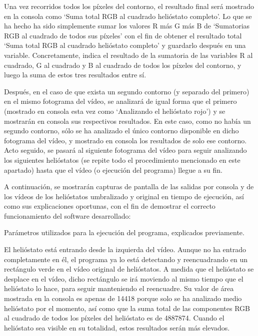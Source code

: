 \documentclass[12pt]{article}
\begin{document}
Una vez recorridos todos los píxeles del contorno, el resultado final será mostrado en la consola como ‘Suma total RGB al cuadrado helióstato completo’. Lo que se ha hecho ha sido simplemente sumar los valores R más G más B de ‘Sumatorias RGB al cuadrado de todos sus píxeles’ con el fin de obtener el resultado total ‘Suma total RGB al cuadrado helióstato completo’ y guardarlo después en una variable. Concretamente, indica el resultado de la sumatoria de las variables R al cuadrado, G al cuadrado y B al cuadrado de todos los píxeles del contorno, y luego la suma de estos tres resultados entre sí.

Después, en el caso de que exista un segundo contorno (y separado del primero) en el mismo fotograma del vídeo, se analizará de igual forma que el primero (mostrado en consola esta vez como ‘Analizando el helióstato rojo’) y se mostrarán en consola sus respectivos resultados. En este caso, como no había un segundo contorno, sólo se ha analizado el único contorno disponible en dicho fotograma del vídeo, y mostrado en consola los resultados de solo ese contorno. Acto seguido, se pasará al siguiente fotograma del vídeo para seguir analizando los siguientes helióstatos (se repite todo el procedimiento mencionado en este apartado) hasta que el vídeo (o ejecución del programa) llegue a su fin.

A continuación, se mostrarán capturas de pantalla de las salidas por consola y de los vídeos de los helióstatos umbralizado y original en tiempo de ejecución, así como sus explicaciones oportunas, con el fin de demostrar el correcto funcionamiento del software desarrollado:




Parámetros utilizados para la ejecución del programa, explicados previamente.



 
El helióstato está entrando desde la izquierda del vídeo. Aunque no ha entrado completamente en él, el programa ya lo está detectando y reencuadrando en un rectángulo verde en el vídeo original de helióstatos. A medida que el helióstato se desplace en el vídeo, dicho rectángulo se irá moviendo al mismo tiempo que el helióstato lo hace, para seguir manteniendo el reencuadre. Su valor de área mostrada en la consola es apenas de 14418 porque solo se ha analizado medio helióstato por el momento, así como que la suma total de las componentes RGB al cuadrado de todos los píxeles del helióstato es de 4887874. Cuando el helióstato sea visible en su totalidad, estos resultados serán más elevados.
\end{document}

